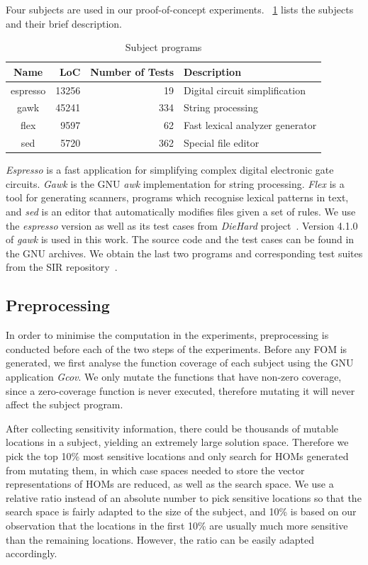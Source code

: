 \documentclass[oribibl]{llncs}
\begin{document}
Four subjects are used in our proof-of-concept experiments. 
\tablename~\ref{tab_subject} lists the subjects and their brief description.

\begin{table}[ht]
\centering
\caption{Subject programs}
\label{tab_subject}
\begin{tabular}{crrl}
\hline
Name & LoC & Number of Tests & Description \\
\hline
espresso & 13256 & 19 & Digital circuit simplification\\
gawk & 45241 & 334 & String processing\\
flex & 9597 & 62 & Fast lexical analyzer generator\\
sed & 5720 & 362 & Special file editor\\
\hline
\end{tabular}%
\end{table}

\emph{Espresso} is a fast application for simplifying complex digital electronic gate circuits.
\emph{Gawk} is the GNU \emph{awk} implementation for string processing.
\emph{Flex} is a tool for generating scanners, programs which recognise lexical patterns in text, and \emph{sed} is an editor that automatically modifies files given a set of rules. 
We use the \emph{espresso} version as well as its test cases from \emph{DieHard} project~\cite{Berger:2006:DPM:1133981.1134000}.
Version 4.1.0 of \emph{gawk} is used in this work.
The source code and the test cases can be found in the GNU archives.
We obtain the last two programs and corresponding test suites from the SIR repository~\cite{SIR2005}. 

\subsection{Preprocessing}
\label{sec_preprocessing}

In order to minimise the computation in the experiments, preprocessing is conducted before each of the two steps of the experiments.
Before any FOM is generated, we first analyse the function coverage of each subject using the GNU application \emph{Gcov}.
We only mutate the functions that have non-zero coverage, since a zero-coverage function is never executed, therefore mutating it will never affect the subject program.

After collecting sensitivity information, there could be thousands of mutable locations in a subject, yielding an extremely large solution space.
Therefore we pick the top 10\% most sensitive locations and only search for HOMs generated from mutating them, in which case spaces needed to store the vector representations of HOMs are reduced, as well as the search space.
We use a relative ratio instead of an absolute number to pick sensitive locations so that the search space is fairly adapted to the size of the subject, and 10\% is based on our observation that the locations in the first 10\% are usually much more sensitive than the remaining locations.
However, the ratio can be easily adapted accordingly.
\end{document}

